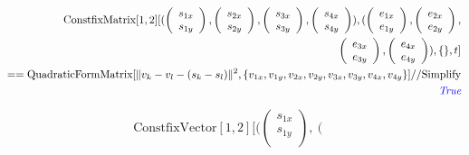 \documentclass[8pt]{article}
\begin{document}
\begin{screen}
\begin{eqnarray*}
\text{ConstfixMatrix}[1,2][(\left(\begin{array}{c}
s_{1x}\\
s_{1y}\\
\end{array}\right),\left(\begin{array}{c}
s_{2x}\\
s_{2y}\\
\end{array}\right),\left(\begin{array}{c}
s_{3x}\\
s_{3y}\\
\end{array}\right),\left(\begin{array}{c}
s_{4x}\\
s_{4y}\\
\end{array}\right)),(\left(\begin{array}{c}
e_{1x}\\
e_{1y}\\
\end{array}\right),\left(\begin{array}{c}
e_{2x}\\
e_{2y}\\
\end{array}\right),\\
\left(\begin{array}{c}
e_{3x}\\
e_{3y}\\
\end{array}\right),\left(\begin{array}{c}
e_{4x}\\
e_{4y}\\
\end{array}\right)), \{\}, t]\\
==\text{QuadraticFormMatrix}[\|v_k - v_l - (s_k - s_l)\|^2,\{v_{1x},v_{1y},v_{2x},v_{2y},v_{3x},v_{3y},v_{4x},v_{4y}\}]
//\text{Simplify}\\
\text{\it \color{blue}True}\\
\end{eqnarray*}
\begin{eqnarray*}
\text{ConstfixVector}[1,2][(\left(\begin{array}{c}
s_{1x}\\
s_{1y}\\
\end{array}\right),\left(\begin{array}{c}

\end{array}
\end{eqnarray*}
\end{screen}
\end{document}
